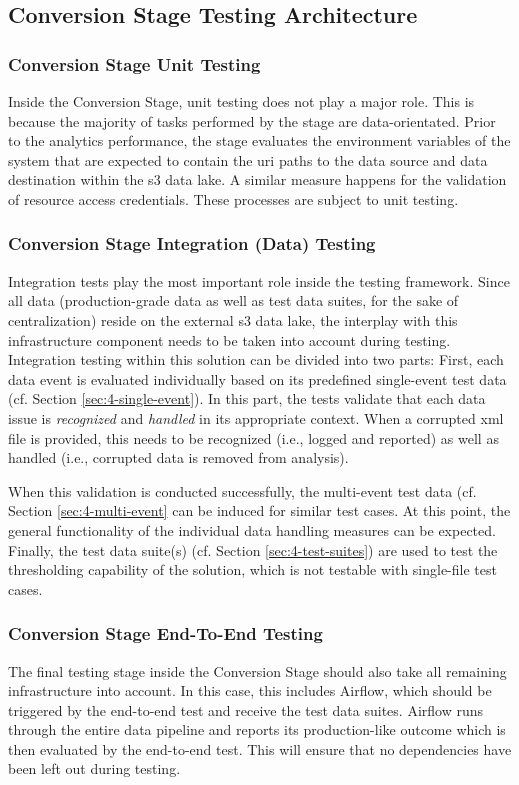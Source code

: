 \subsection{Conversion Stage Testing Architecture}
\subsubsection{Conversion Stage Unit Testing}
Inside the Conversion Stage, unit testing does not play a major role. This is because the majority of tasks performed by the stage are data-orientated. Prior to the analytics performance, the stage evaluates the environment variables of the system that are expected to contain the \ac{uri} paths to the data source and data destination within the \ac{s3} data lake. A similar measure happens for the validation of resource access credentials. These processes are subject to unit testing.

\subsubsection{Conversion Stage Integration (Data) Testing}
Integration tests play the most important role inside the testing framework. Since all data (production-grade data as well as test data suites, for the sake of centralization) reside on the external \ac{s3} data lake, the interplay with this infrastructure component needs to be taken into account during testing. Integration testing within this solution can be divided into two parts: First, each data event is evaluated individually based on its predefined single-event test data (cf. Section \ref{sec:4-single-event}). In this part, the tests validate that each data issue is \textit{recognized} and \textit{handled} in its appropriate context. When a corrupted \ac{xml} file is provided, this needs to be recognized (i.e., logged and reported) as well as handled (i.e., corrupted data is removed from analysis).

When this validation is conducted successfully, the multi-event test data (cf. Section \ref{sec:4-multi-event} can be induced for similar test cases. At this point, the general functionality of the individual data handling measures can be expected. Finally, the test data suite(s) (cf. Section \ref{sec:4-test-suites}) are used to test the thresholding capability of the solution, which is not testable with single-file test cases.

\subsubsection{Conversion Stage End-To-End Testing}
The final testing stage inside the Conversion Stage should also take all remaining infrastructure into account. In this case, this includes Airflow, which should be triggered by the end-to-end test and receive the test data suites. Airflow runs through the entire data pipeline and reports its production-like outcome which is then evaluated by the end-to-end test. This will ensure that no dependencies have been left out during testing.

